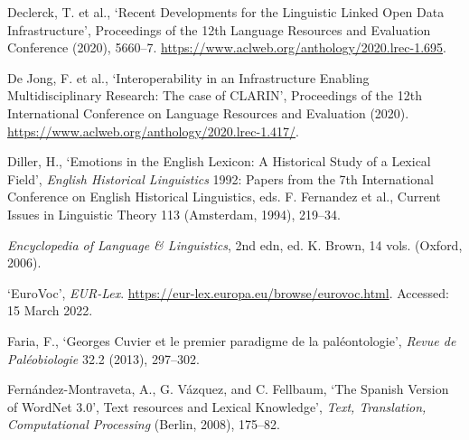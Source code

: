 \begin{list}{}

\item %
Declerck, T. et al., `Recent Developments for the Linguistic Linked Open Data Infrastructure', Proceedings of the 12th Language Resources and Evaluation Conference (2020), 5660–7. \url{https://www.aclweb.org/anthology/2020.lrec-1.695}.

\item %
De Jong, F. et al., `Interoperability in an Infrastructure Enabling Multidisciplinary Research: The case of CLARIN', Proceedings of the 12th International Conference on Language Resources and Evaluation (2020). \url{https://www.aclweb.org/anthology/2020.lrec-1.417/}.

\item %
Diller, H., `Emotions in the English Lexicon: A Historical Study of a Lexical Field', \textit{English Historical Linguistics} 1992: Papers from the 7th International Conference on English Historical Linguistics, eds. F. Fernandez et al., Current Issues in Linguistic Theory 113 (Amsterdam, 1994), 219–34.


\item %
\textit{Encyclopedia of Language \& Linguistics}, 2nd edn, ed. K. Brown, 14 vols. (Oxford, 2006).

\item %
`EuroVoc', \textit{EUR-Lex}. \url{https://eur-lex.europa.eu/browse/eurovoc.html}. Accessed: 15 March 2022.

\item %
Faria, F., `Georges Cuvier et le premier paradigme de la paléontologie', \textit{Revue de Paléobiologie} 32.2 (2013), 297–302.

\item %
Fernández-Montraveta, A., G. Vázquez, and C. Fellbaum, `The Spanish Version of WordNet 3.0', Text resources and Lexical Knowledge', \textit{Text, Translation, Computational Processing} (Berlin, 2008), 175–82.


\end{list}
